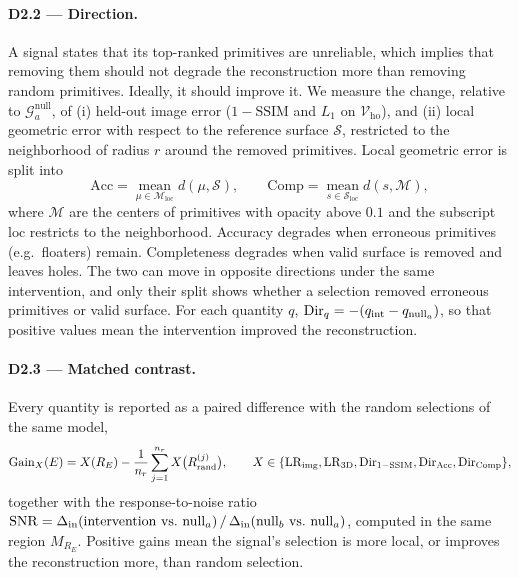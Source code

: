 \paragraph{D2.2 — Direction.}
A signal states that its top-ranked primitives are unreliable, which implies that removing them should
not degrade the reconstruction more than removing random primitives. Ideally, it should improve it. We
measure the change, relative to $\mathcal{G}^{\mathrm{null}}_a$, of
(i) held-out image error ($1-\mathrm{SSIM}$ and $L_1$ on $\mathcal{V}_{\mathrm{ho}}$), and
(ii) local geometric error with respect to the reference surface $\mathcal{S}$, restricted to the
neighborhood of radius $r$ around the removed primitives. Local geometric error is split into
\begin{equation}
  \mathrm{Acc} = \operatorname*{mean}_{\mu\in\mathcal{M}_{\mathrm{loc}}} d(\mu,\mathcal{S}), \qquad
  \mathrm{Comp} = \operatorname*{mean}_{s\in\mathcal{S}_{\mathrm{loc}}} d(s,\mathcal{M}),
\end{equation}
where $\mathcal{M}$ are the centers of primitives with opacity above $0.1$ and the subscript
$\mathrm{loc}$ restricts to the neighborhood. Accuracy degrades when erroneous primitives
(e.g.\ floaters) remain. Completeness degrades when valid surface is removed and leaves holes. The two
can move in opposite directions under the same intervention, and only their split shows whether a
selection removed erroneous primitives or valid surface. For each quantity $q$,
$\mathrm{Dir}_q=-(q_{\mathrm{int}}-q_{\mathrm{null}_a})$, so that positive values mean the intervention improved
the reconstruction.

\paragraph{D2.3 — Matched contrast.}
Every quantity is reported as a paired difference with the random selections of the same model,
\begin{equation}
  \mathrm{Gain}_X(E) = X(R_E) - \frac{1}{n_r}\sum_{j=1}^{n_r} X\bigl(R^{(j)}_{\mathrm{rand}}\bigr),
  \qquad X\in\{\mathrm{LR}_{\mathrm{img}},\mathrm{LR}_{\mathrm{3D}},\mathrm{Dir}_{1-\mathrm{SSIM}},\mathrm{Dir}_{\mathrm{Acc}},\mathrm{Dir}_{\mathrm{Comp}}\},
\end{equation}
together with the response-to-noise ratio
$\mathrm{SNR}=\din(\text{intervention vs.\ null}_a)\,/\,\din(\text{null}_b\text{ vs.\ null}_a)$, computed in
the same region $M_{R_E}$. Positive gains mean the signal's selection is more local, or improves the
reconstruction more, than random selection.

